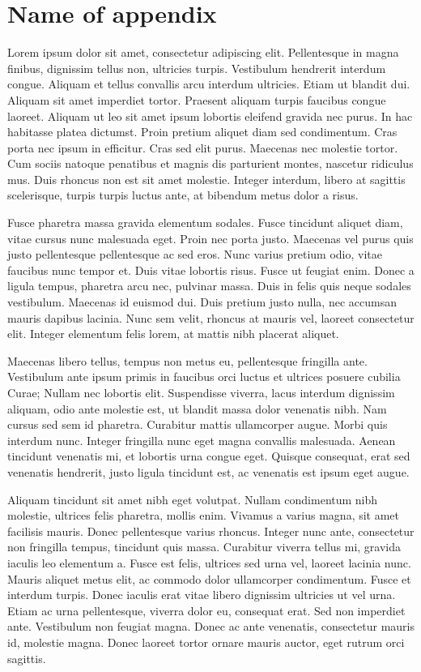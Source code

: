 \chapter{Name of appendix}

Lorem ipsum dolor sit amet, consectetur adipiscing elit. Pellentesque in magna finibus, dignissim tellus non, ultricies turpis. Vestibulum hendrerit interdum congue. Aliquam et tellus convallis arcu interdum ultricies. Etiam ut blandit dui. Aliquam sit amet imperdiet tortor. Praesent aliquam turpis faucibus congue laoreet. Aliquam ut leo sit amet ipsum lobortis eleifend gravida nec purus. In hac habitasse platea dictumst. Proin pretium aliquet diam sed condimentum. Cras porta nec ipsum in efficitur. Cras sed elit purus. Maecenas nec molestie tortor. Cum sociis natoque penatibus et magnis dis parturient montes, nascetur ridiculus mus. Duis rhoncus non est sit amet molestie. Integer interdum, libero at sagittis scelerisque, turpis turpis luctus ante, at bibendum metus dolor a risus.

Fusce pharetra massa gravida elementum sodales. Fusce tincidunt aliquet diam, vitae cursus nunc malesuada eget. Proin nec porta justo. Maecenas vel purus quis justo pellentesque pellentesque ac sed eros. Nunc varius pretium odio, vitae faucibus nunc tempor et. Duis vitae lobortis risus. Fusce ut feugiat enim. Donec a ligula tempus, pharetra arcu nec, pulvinar massa. Duis in felis quis neque sodales vestibulum. Maecenas id euismod dui. Duis pretium justo nulla, nec accumsan mauris dapibus lacinia. Nunc sem velit, rhoncus at mauris vel, laoreet consectetur elit. Integer elementum felis lorem, at mattis nibh placerat aliquet.

Maecenas libero tellus, tempus non metus eu, pellentesque fringilla ante. Vestibulum ante ipsum primis in faucibus orci luctus et ultrices posuere cubilia Curae; Nullam nec lobortis elit. Suspendisse viverra, lacus interdum dignissim aliquam, odio ante molestie est, ut blandit massa dolor venenatis nibh. Nam cursus sed sem id pharetra. Curabitur mattis ullamcorper augue. Morbi quis interdum nunc. Integer fringilla nunc eget magna convallis malesuada. Aenean tincidunt venenatis mi, et lobortis urna congue eget. Quisque consequat, erat sed venenatis hendrerit, justo ligula tincidunt est, ac venenatis est ipsum eget augue.

Aliquam tincidunt sit amet nibh eget volutpat. Nullam condimentum nibh molestie, ultrices felis pharetra, mollis enim. Vivamus a varius magna, sit amet facilisis mauris. Donec pellentesque varius rhoncus. Integer nunc ante, consectetur non fringilla tempus, tincidunt quis massa. Curabitur viverra tellus mi, gravida iaculis leo elementum a. Fusce est felis, ultrices sed urna vel, laoreet lacinia nunc. Mauris aliquet metus elit, ac commodo dolor ullamcorper condimentum. Fusce et interdum turpis. Donec iaculis erat vitae libero dignissim ultricies ut vel urna. Etiam ac urna pellentesque, viverra dolor eu, consequat erat. Sed non imperdiet ante. Vestibulum non feugiat magna. Donec ac ante venenatis, consectetur mauris id, molestie magna. Donec laoreet tortor ornare mauris auctor, eget rutrum orci sagittis.

